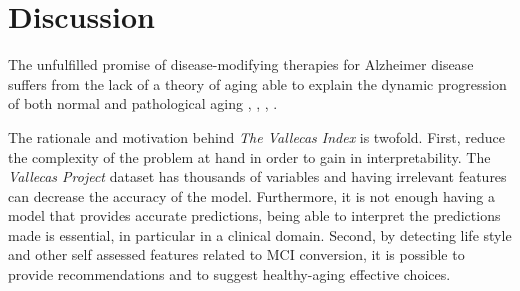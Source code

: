 \documentclass[preprint,12pt]{elsarticle}
\begin{document}
\section{Discussion}
\label{se:dis}

The unfulfilled promise of disease-modifying therapies for Alzheimer disease suffers from the lack of a theory of aging able to explain the dynamic progression of both normal and pathological aging \cite{cerella1985information}, \cite{mangel2001complex}, \cite{sleimen2014aging}, \cite{cohen2016complex}.


The rationale and motivation behind \emph{The Vallecas Index} is twofold. First, reduce the complexity of the problem at hand in order to gain in interpretability. The \emph{Vallecas Project} dataset has thousands of variables and having irrelevant features can decrease the accuracy of the model. Furthermore, it is not enough having a model that provides accurate predictions, being able to interpret the predictions made is essential, in particular in a clinical domain.
Second, by detecting life style and other self assessed features related to MCI conversion, it is possible to provide recommendations and to suggest healthy-aging effective choices.
















\end{document}

